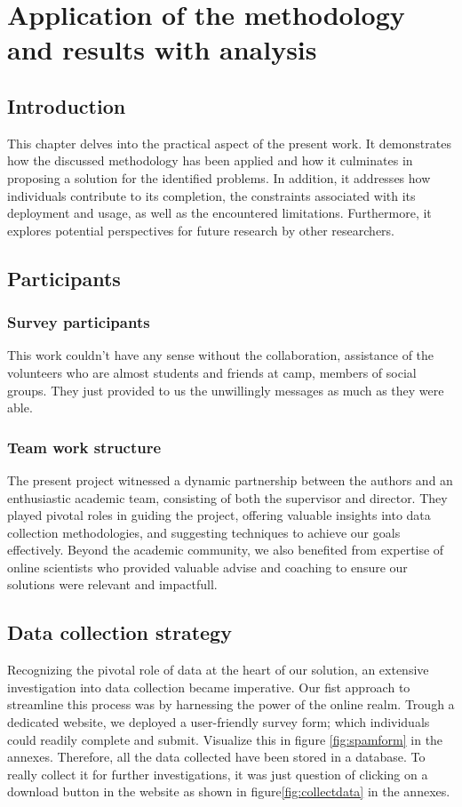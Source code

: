 \documentclass[12pt,a4paper, oneside]{book}
\begin{document}
\chapter{Application of the methodology and results with analysis}   
\section{Introduction} 
This chapter delves into the practical aspect of the present work. It demonstrates how the discussed methodology has been applied and how it culminates in proposing a solution for the identified problems. In addition, it addresses how individuals contribute to its completion, the constraints associated with its deployment and usage, as well as the encountered limitations. Furthermore, it explores potential perspectives for future research by other researchers. 
\section{Participants}
\subsection{Survey participants}
This work couldn't have any sense without the collaboration, assistance of the volunteers who are almost students and friends at camp, members of social groups. They just provided to us the unwillingly messages as much as they were able. 
\subsection{Team work structure} 
The present project witnessed a dynamic partnership between the authors and an enthusiastic academic team, consisting of both the supervisor and director. They played pivotal roles in guiding the project, offering valuable insights into data collection methodologies, and suggesting techniques to achieve our goals effectively. Beyond the academic community, we also benefited from expertise of online scientists who provided valuable advise and coaching to ensure our solutions were relevant and impactfull.

\section{Data collection strategy } 
Recognizing the pivotal role of data at the heart of our solution, an extensive investigation into data collection became imperative. Our fist approach to streamline this process was by harnessing the power of the online realm. Trough a dedicated website, we deployed a user-friendly survey form; which individuals could readily complete and submit. Visualize this in figure \ref{fig:spamform} in the annexes.
Therefore, all the data collected have been stored in a database. To really collect it for further investigations, it was just question of clicking on a download button in the website as shown in figure\ref{fig:collectdata} in the annexes.
\end{document}

